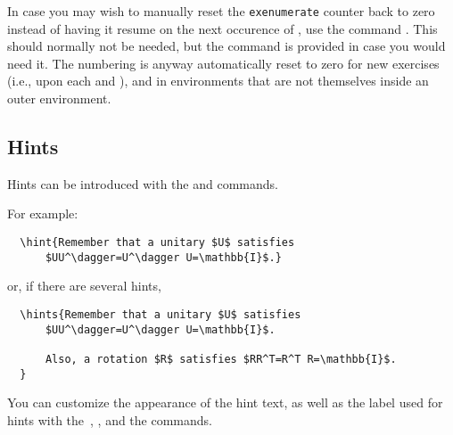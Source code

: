 \documentclass[11pt,a4paper]{article}
\begin{document}
In case you may wish to manually reset the \texttt{exenumerate} counter back to zero
instead of having it resume on the next occurence of , use the command
. This 
should normally not be needed, but the command is provided in case you would need it. The
numbering is anyway automatically reset to zero for new exercises (i.e., upon each
 and ), and in  environments that are not
themselves inside an outer  environment. 



\subsection{Hints}
\label{sec:Hints}

Hints can be introduced with the  and  commands.



For example:
\begin{pkgverbatim}
\begin{verbatim}
  \hint{Remember that a unitary $U$ satisfies
      $UU^\dagger=U^\dagger U=\mathbb{I}$.}
\end{verbatim}
\end{pkgverbatim}
or, if there are several hints,
\begin{pkgverbatim}
\begin{verbatim}
  \hints{Remember that a unitary $U$ satisfies
      $UU^\dagger=U^\dagger U=\mathbb{I}$.

      Also, a rotation $R$ satisfies $RR^T=R^T R=\mathbb{I}$.
  }
\end{verbatim}
\end{pkgverbatim}

\begin{pkgtip}
  You can customize the appearance of the hint text, as well as the label used for hints
  with the~, , and the
   commands.
\end{pkgtip}
\end{document}
